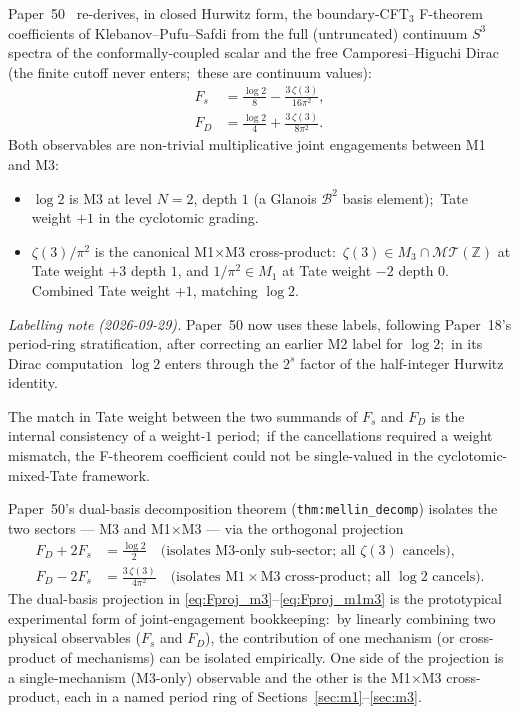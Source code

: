 \documentclass[11pt,a4paper]{article}
\theoremstyle{plain}
\theoremstyle{definition}
\newcommand{\sthree}{S^{3}}
\newcommand{\Z}{\mathbb{Z}}
\newcommand{\MT}{\mathcal{MT}}
\newcommand{\Bcal}{\mathcal{B}}
\begin{document}
Paper~50~\cite{loutey_paper50} re-derives, in closed Hurwitz form,
the boundary-CFT$_3$ F-theorem coefficients of Klebanov--Pufu--Safdi
from the full (untruncated) continuum $\sthree$ spectra of the
conformally-coupled scalar and the free Camporesi--Higuchi Dirac (the
finite cutoff never enters;\ these are continuum values):
\begin{align}
\label{eq:paper50_Fs}
F_s &= \frac{\log 2}{8} - \frac{3\,\zeta(3)}{16\pi^2}, \\
\label{eq:paper50_FD}
F_D &= \frac{\log 2}{4} + \frac{3\,\zeta(3)}{8\pi^2}.
\end{align}
Both observables are non-trivial multiplicative joint engagements
between M1 and M3:
\begin{itemize}
  \item $\log 2$ is M3 at level $N = 2$, depth $1$ (a Glanois
    $\Bcal^2$ basis element);\ Tate weight $+1$ in the cyclotomic
    grading.
  \item $\zeta(3)/\pi^2$ is the canonical M1$\times$M3 cross-product:\
    $\zeta(3) \in M_3 \cap \MT(\Z)$ at Tate weight $+3$ depth $1$,
    and $1/\pi^2 \in M_1$ at Tate weight $-2$ depth $0$.  Combined
    Tate weight $+1$, matching $\log 2$.
\end{itemize}
\emph{Labelling note (2026-09-29).} Paper~50 now uses these labels,
following Paper~18's period-ring stratification, after correcting an
earlier M2 label for $\log 2$;\ in its Dirac computation $\log 2$ enters
through the $2^{s}$ factor of the half-integer Hurwitz identity.

The match in Tate weight between the two summands of $F_s$ and $F_D$
is the internal consistency of a weight-$1$ period;\ if the cancellations
required a weight mismatch, the F-theorem coefficient could not be
single-valued in the cyclotomic-mixed-Tate framework.

Paper~50's dual-basis decomposition theorem
(\texttt{thm:mellin\_decomp}) isolates the two sectors --- M3 and
M1$\times$M3 --- via the
orthogonal projection
\begin{align}
\label{eq:Fproj_m3}
F_D + 2 F_s &= \frac{\log 2}{2}
  \quad \text{(isolates M3-only sub-sector;\ all $\zeta(3)$ cancels)}, \\
\label{eq:Fproj_m1m3}
F_D - 2 F_s &= \frac{3\,\zeta(3)}{4\pi^2}
  \quad \text{(isolates M1$\times$M3 cross-product;\ all $\log 2$ cancels)}.
\end{align}
The dual-basis projection in \eqref{eq:Fproj_m3}--\eqref{eq:Fproj_m1m3}
is the prototypical experimental form of joint-engagement bookkeeping:\
by linearly combining two physical observables ($F_s$ and $F_D$),
the contribution of one mechanism (or cross-product of mechanisms)
can be isolated empirically.  One side of the projection is a
single-mechanism (M3-only) observable and the other is the M1$\times$M3
cross-product, each in a named period ring of
Sections~\ref{sec:m1}--\ref{sec:m3}.
\end{document}
